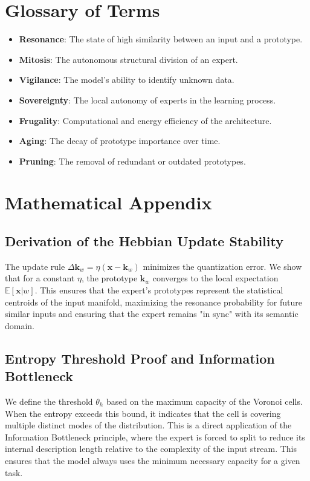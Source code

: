 \documentclass[11pt,hidelinks]{article}
\begin{document}
\section{Glossary of Terms}
\begin{itemize}
    \item \textbf{Resonance}: The state of high similarity between an input and a prototype.
    \item \textbf{Mitosis}: The autonomous structural division of an expert.
    \item \textbf{Vigilance}: The model's ability to identify unknown data.
    \item \textbf{Sovereignty}: The local autonomy of experts in the learning process.
    \item \textbf{Frugality}: Computational and energy efficiency of the architecture.
    \item \textbf{Aging}: The decay of prototype importance over time.
    \item \textbf{Pruning}: The removal of redundant or outdated prototypes.
\end{itemize}

\section{Mathematical Appendix}
\subsection{Derivation of the Hebbian Update Stability}
The update rule $\Delta \mathbf{k}_w = \eta (\mathbf{x} - \mathbf{k}_w)$ minimizes the quantization error. We show that for a constant $\eta$, the prototype $\mathbf{k}_w$ converges to the local expectation $\mathbb{E}[\mathbf{x} | w]$. This ensures that the expert's prototypes represent the statistical centroids of the input manifold, maximizing the resonance probability for future similar inputs and ensuring that the expert remains "in sync" with its semantic domain.

\subsection{Entropy Threshold Proof and Information Bottleneck}
We define the threshold $\theta_h$ based on the maximum capacity of the Voronoi cells. When the entropy exceeds this bound, it indicates that the cell is covering multiple distinct modes of the distribution. This is a direct application of the Information Bottleneck principle, where the expert is forced to split to reduce its internal description length relative to the complexity of the input stream. This ensures that the model always uses the minimum necessary capacity for a given task.
\end{document}
